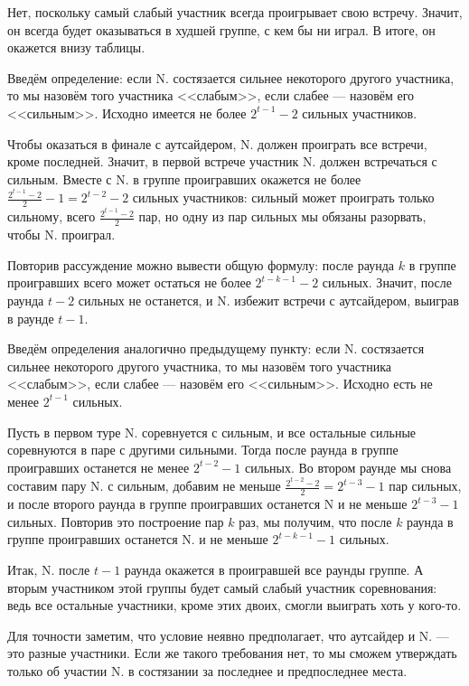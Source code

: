 \begin{itemize}
\itA Нет, поскольку самый слабый участник всегда проигрывает свою встречу.
Значит, он всегда будет оказываться в худшей группе, с кем бы ни играл.
В итоге, он окажется внизу таблицы.

\itB Введём определение: если N. состязается сильнее некоторого другого участника,
то мы назовём того участника <<слабым>>, если слабее --- назовём его <<сильным>>.
Исходно имеется не более $2^{t-1}-2$ сильных участников.

Чтобы оказаться в финале с аутсайдером, N. должен проиграть все встречи,
кроме последней. Значит, в первой встрече участник N. должен встречаться с сильным.
Вместе с N. в группе проигравших окажется не более $\frac{2^{t-1}-2}{2}-1 = 2^{t-2}-2$ 
сильных участников: сильный может проиграть только сильному, всего 
$\frac{2^{t-1}-2}{2}$ пар, но одну из пар сильных мы обязаны разорвать, чтобы 
N. проиграл.

Повторив рассуждение можно вывести общую формулу: после раунда $k$ 
в группе проигравших всего может остаться не более $2^{t-k-1}-2$ сильных. 
Значит, после раунда $t-2$ сильных не останется, и N. избежит встречи с аутсайдером, 
выиграв в раунде $t-1$.

\itC Введём определения аналогично предыдущему пункту: если N. состязается сильнее 
некоторого другого участника, то мы назовём того участника <<слабым>>, если 
слабее --- назовём его <<сильным>>. Исходно есть не менее $2^{t-1}$ сильных. 

Пусть в первом туре N. соревнуется с сильным, и все остальные\linebreak
сильные соревнуются в паре с другими сильными. 
Тогда после раунда в группе проигравших останется не менее $2^{t-2}-1$ сильных.
Во втором раунде мы снова составим пару N. с сильным, добавим не меньше $\frac{2^{t-2}-2}{2} = 2^{t-3}-1$ 
пар сильных, и после второго раунда в группе проигравших останется N и
не меньше $2^{t-3}-1$ сильных. Повторив это построение пар $k$ раз,
мы получим, что после $k$ раунда в группе проигравших останется N. и не меньше $2^{t-k-1}-1$ сильных. 

Итак, N. после $t-1$ раунда окажется в проигравшей все раунды 
группе. А вторым участником этой группы будет самый слабый участник соревнования:
ведь все остальные участники, кроме этих двоих, смогли выиграть хоть у кого-то. 

Для точности заметим, что условие неявно предполагает, что аутсайдер и N. --- 
это разные участники. Если же такого требования нет, то мы сможем утверждать только
об участии N. в состязании за последнее и предпоследнее места.
\end{itemize}
